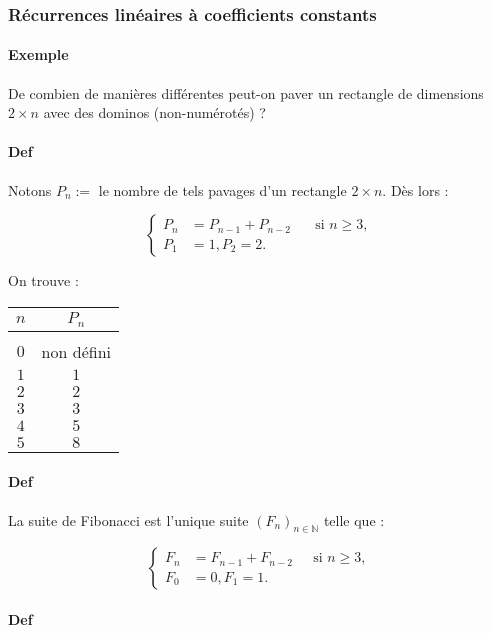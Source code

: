 \documentclass{article}
\begin{document}
			\subsubsection{Récurrences linéaires à coefficients constants}

			\paragraph{Exemple} De combien de manières différentes peut-on paver un rectangle de dimensions $2 \times n$ avec des dominos (non-numérotés) ?

			\paragraph{Def} Notons $P_n := $ le nombre de tels pavages d'un rectangle $2 \times n$. Dès lors :

			\[\left\{\begin{aligned}
				P_n &= P_{n-1} + P_{n-2} \;\;\;\;\; \text{ si $n \geq 3$}, \\
				P_1 &= 1, P_2 = 2.
			\end{aligned}\right.\]

			On trouve :

			\begin{center}\begin{tabular}{c|c}
				$n$ & $P_n$ \\
				\hline \\
				$0$ & non défini \\
				$1$ & $1$ \\
				$2$ & $2$ \\
				$3$ & $3$ \\
				$4$ & $5$ \\
				$5$ & $8$
			\end{tabular}\end{center}

			\paragraph{Def} La suite de Fibonacci est l'unique suite $(F_n)_{n \in \mathbb N}$ telle que :

			\[\left\{\begin{aligned}
				F_n &= F_{n-1} + F_{n-2} \;\;\;\;\text{ si $n \geq 3$}, \\
				F_0 &= 0, F_1 = 1.
			\end{aligned}\right.\]

			\paragraph{Def}
\end{document}

